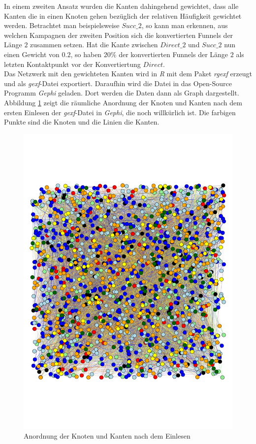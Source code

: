In einem zweiten Ansatz wurden die Kanten dahingehend gewichtet, dass alle Kanten die in einen Knoten gehen bezüglich der relativen Häufigkeit gewichtet werden. Betrachtet man beispielsweise $Succ\_2$, so kann man erkennen, aus welchen Kampagnen der zweiten Position sich die konvertierten Funnels der Länge $2$ zusammen setzen. Hat die Kante zwischen $Direct\_2$ und $Succ\_2$ nun einen Gewicht von $0.2$, so haben $20 \%$ der konvertierten Funnels der Länge $2$ als letzten Kontaktpunkt vor der Konvertiertung $Direct$.\\
Das Netzwerk mit den gewichteten Kanten wird in \textit{R} mit dem Paket \textit{rgexf} \cite{rgexf} erzeugt und als \textit{gexf}-Datei exportiert. Daraufhin wird die Datei in das Open-Source Programm \textit{Gephi} \cite{gephi_bastian} geladen. Dort werden die Daten dann als Graph dargestellt. Abbildung \ref{graphbegin} zeigt die räumliche Anordnung der Knoten und Kanten nach dem ersten Einlesen der \textit{gexf}-Datei in \textit{Gephi}, die noch willkürlich ist. Die farbigen Punkte sind die Knoten und die Linien die Kanten.
\begin{figure}[H]
	\centering\includegraphics[scale=0.6]{graphbegin.pdf}\caption{Anordnung der Knoten und Kanten nach dem Einlesen}\label{graphbegin}
\end{figure}
